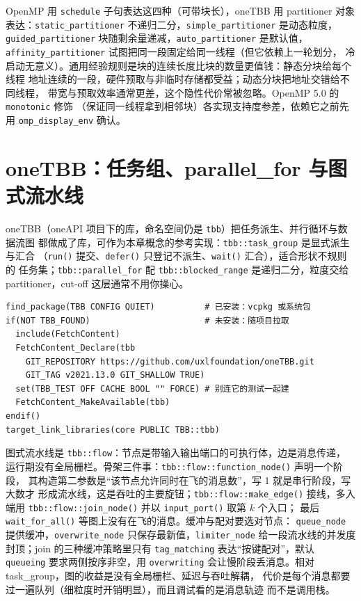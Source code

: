 \documentclass[12pt,a4paper,fontset=fandol]{ctexbook}
\newcommand{\Fn}[1]{\texttt{#1()}}
\newcommand{\Tp}[1]{\texttt{#1}}
\begin{document}
OpenMP 用 \Tp{schedule} 子句表达这四种（可带块长），oneTBB 用 partitioner 对象
表达：\Tp{static\_partitioner} 不递归二分，\Tp{simple\_partitioner} 是动态粒度，
\Tp{guided\_partitioner} 块随剩余量递减，\Tp{auto\_partitioner} 是默认值，
\Tp{affinity\_partitioner} 试图把同一段固定给同一线程（但它依赖上一轮划分，
冷启动无意义）。通用经验规则是块的连续长度比块的数量更值钱：静态分块给每个线程
地址连续的一段，硬件预取与非临时存储都受益；动态分块把地址交错给不同线程，
带宽与预取效率通常更差，这个隐性代价常被忽略。OpenMP 5.0 的 \Tp{monotonic} 修饰
（保证同一线程拿到相邻块）各实现支持度参差，依赖它之前先用
\Tp{omp\_display\_env} 确认。

\section{oneTBB：任务组、parallel\_for 与图式流水线}

oneTBB（oneAPI 项目下的库，命名空间仍是 \Tp{tbb}）把任务派生、并行循环与数据流图
都做成了库，可作为本章概念的参考实现：\Tp{tbb::task\_group} 是显式派生与汇合
（\Fn{run} 提交、\Fn{defer} 只登记不派生、\Fn{wait} 汇合），适合形状不规则的
任务集；\Tp{tbb::parallel\_for} 配 \Tp{tbb::blocked\_range} 是递归二分，粒度交给
partitioner，cut-off 这层通常不用你操心。
\begin{lstlisting}[style=cmakestyle,caption={查找并链接 oneTBB：安装版与 FetchContent 两条路}]
find_package(TBB CONFIG QUIET)          # 已安装：vcpkg 或系统包
if(NOT TBB_FOUND)                       # 未安装：随项目拉取
  include(FetchContent)
  FetchContent_Declare(tbb
    GIT_REPOSITORY https://github.com/uxlfoundation/oneTBB.git
    GIT_TAG v2021.13.0 GIT_SHALLOW TRUE)
  set(TBB_TEST OFF CACHE BOOL "" FORCE) # 别连它的测试一起建
  FetchContent_MakeAvailable(tbb)
endif()
target_link_libraries(core PUBLIC TBB::tbb)
\end{lstlisting}

图式流水线是 \Tp{tbb::flow}：节点是带输入输出端口的可执行体，边是消息传递，
运行期没有全局栅栏。骨架三件事：\Fn{tbb::flow::function\_node} 声明一个阶段，
其构造第二参数是``该节点允许同时在飞的消息数''，写 1 就是串行阶段，写大数才
形成流水线，这是吞吐的主要旋钮；\Fn{tbb::flow::make\_edge} 接线，多入端用
\Fn{tbb::flow::join\_node} 并以 \Fn{input\_port} 取第 $k$ 个入口；
最后 \Fn{wait\_for\_all} 等图上没有在飞的消息。缓冲与配对要选对节点：
\Tp{queue\_node} 提供缓冲，\Tp{overwrite\_node} 只保存最新值，\Tp{limiter\_node}
给一段流水线的并发度封顶；join 的三种缓冲策略里只有 \Tp{tag\_matching}
表达``按键配对''，默认 \Tp{queueing} 要求两侧按序非空，用 \Tp{overwriting}
会让慢阶段丢消息。相对 task\_group，图的收益是没有全局栅栏、延迟与吞吐解耦，
代价是每个消息都要过一遍队列（细粒度时开销明显），而且调试看的是消息轨迹
而不是调用栈。
\end{document}
